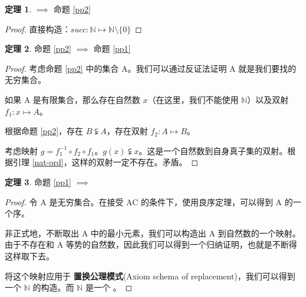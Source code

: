 \documentclass{ctexart}
\theoremstyle{definition}
\newtheorem{theorem}{定理}[section]
\begin{document}
\begin{theorem}
   $\implies$ 命题 \ref{pp2}
\end{theorem}

\begin{proof}
  直接构造：$succ: \mathbb{N} \mapsto \mathbb{N} \setminus \{0\}$
\end{proof}

\begin{theorem}
  命题 \ref{pp2} $\implies$ 命题 \ref{pp1}
\end{theorem}

\begin{proof}
  考虑命题 \ref{pp2} 中的集合 A。我们可以通过反证法证明 A 就是我们要找的无穷集合。

  如果 A 是有限集合，那么存在自然数 $x$（在这里，我们不能使用 $\mathbb{N}$）以及双射 $f_1: x \mapsto A$。

  根据命题 \ref{pp2}，存在 $B \subsetneqq A$，存在双射 $f_2: A \mapsto B$。

  考虑映射 $g = f_1^{-1} \circ f_2 \circ f_1$。$g(x) \subsetneqq x$。这是一个自然数到自身真子集的双射。根据引理 \ref{nat-ord}，这样的双射一定不存在。矛盾。
\end{proof}

\begin{theorem}
  命题 \ref{pp1} $\implies$ 
\end{theorem}

\begin{proof}
  令 A 是无穷集合。在接受 AC 的条件下，使用良序定理，可以得到 A 的一个序。

  非正式地，不断取出 A 中的最小元素，我们可以构造出 A 到自然数的一个映射。由于不存在和 A 等势的自然数，因此我们可以得到一个归纳证明，也就是不断得这样取下去。

  将这个映射应用于 \textbf{置换公理模式}(Axiom schema of replacement)，我们可以得到一个 $\mathbb{N}$ 的构造。而 $\mathbb{N}$ 是一个 。
\end{proof}
\end{document}
